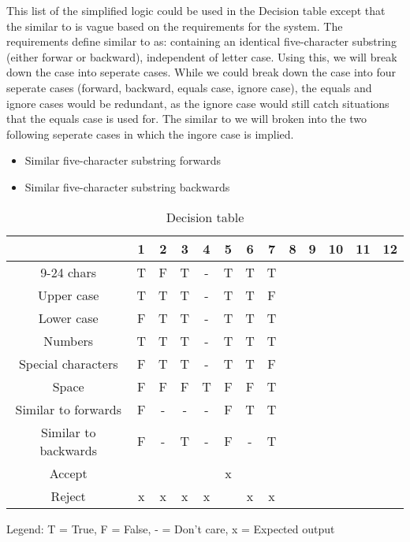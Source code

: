 \documentclass[12pt,letterpaper]{article}
\begin{document}
This list of the simplified logic could be used in the Decision table except that the similar to is vague based on the
requirements for the system. The requirements define similar to as: containing an identical five-character
substring (either forwar or backward), independent of letter case.
Using this, we will break down the case into seperate cases. While we could break down the case into
four seperate cases (forward, backward, equals case, ignore case), the equals and
ignore cases would be redundant, as the ignore case would still catch situations that the equals
case is used for. The similar to we will broken into the two following seperate cases in which the ingore case is implied.
\begin{itemize}
\item Similar five-character substring forwards
\item Similar five-character substring backwards
\end{itemize}

\begin{table}[h]
  \begin{center}
    \caption{Decision table}
    \label{tab:Main table}
    
    \begin{tabular}{c|c|c|c|c|c|c|c|c|c|c|c|c}
    & 1 & 2 & 3 & 4 & 5 & 6 & 7 & 8 & 9 & 10 & 11 & 12\\
    \hline
    9-24 chars & T & F & T & - & T & T & T & & & & & \\
    \hline
    Upper case & T & T & T & - & T & T & F & & & & & \\
    \hline
    Lower case & F & T & T & - & T & T & T & & & & & \\
    \hline
    Numbers & T & T & T & - & T & T & T & & & & & \\
    \hline
    Special characters & F & T & T & - & T & T & F & & & & & \\
    \hline
    Space & F & F & F & T & F & F & T & & & & & \\
    \hline 
    Similar to forwards & F & - & - & - & F & T & T & & & & & \\
    \hline
    Similar to backwards & F & - & T & - & F & - & T & & & & & \\
    \midrule
    Accept & & & & & x & & & & & & & \\
    \hline
    Reject & x & x & x & x & & x & x & & & & & \\
    \end{tabular}
    
    Legend: T = True, F = False, - = Don't care, x = Expected output
  \end{center}
\end{table}
\end{document}
